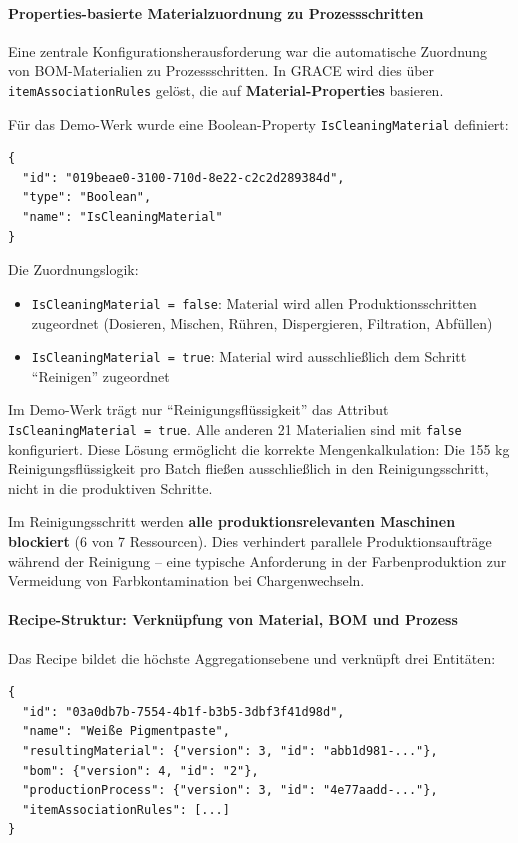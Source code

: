 \paragraph{Properties-basierte Materialzuordnung zu Prozessschritten}

Eine zentrale Konfigurationsherausforderung war die automatische Zuordnung von BOM-Materialien zu Prozessschritten. In GRACE wird dies über \texttt{itemAssociationRules} gelöst, die auf \textbf{Material-Properties} basieren.

Für das Demo-Werk wurde eine Boolean-Property \texttt{IsCleaningMaterial} definiert:

\begin{verbatim}
{
  "id": "019beae0-3100-710d-8e22-c2c2d289384d",
  "type": "Boolean",
  "name": "IsCleaningMaterial"
}
\end{verbatim}

Die Zuordnungslogik:
\begin{itemize}
    \item \texttt{IsCleaningMaterial = false}: Material wird allen Produktionsschritten zugeordnet (Dosieren, Mischen, Rühren, Dispergieren, Filtration, Abfüllen)
    \item \texttt{IsCleaningMaterial = true}: Material wird ausschließlich dem Schritt ``Reinigen'' zugeordnet
\end{itemize}

Im Demo-Werk trägt nur ``Reinigungsflüssigkeit'' das Attribut \texttt{IsCleaningMaterial = true}. Alle anderen 21 Materialien sind mit \texttt{false} konfiguriert. Diese Lösung ermöglicht die korrekte Mengenkalkulation: Die 155 kg Reinigungsflüssigkeit pro Batch fließen ausschließlich in den Reinigungsschritt, nicht in die produktiven Schritte.

Im Reinigungsschritt werden \textbf{alle produktionsrelevanten Maschinen blockiert} (6 von 7 Ressourcen). Dies verhindert parallele Produktionsaufträge während der Reinigung -- eine typische Anforderung in der Farbenproduktion zur Vermeidung von Farbkontamination bei Chargenwechseln.


\paragraph{Recipe-Struktur: Verknüpfung von Material, BOM und Prozess}

Das Recipe bildet die höchste Aggregationsebene und verknüpft drei Entitäten:

\begin{verbatim}
{
  "id": "03a0db7b-7554-4b1f-b3b5-3dbf3f41d98d",
  "name": "Weiße Pigmentpaste",
  "resultingMaterial": {"version": 3, "id": "abb1d981-..."},
  "bom": {"version": 4, "id": "2"},
  "productionProcess": {"version": 3, "id": "4e77aadd-..."},
  "itemAssociationRules": [...]
}
\end{verbatim}


